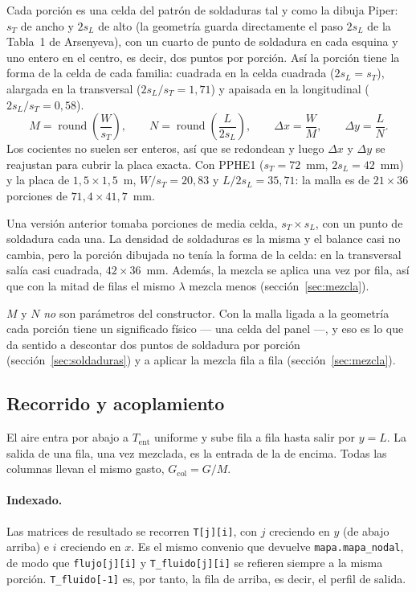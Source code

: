\documentclass[11pt,a4paper]{article}
\begin{document}
Cada porción es una celda del patrón de soldaduras tal y como la dibuja Piper:
$s_T$ de ancho y $2s_L$ de alto (la geometría guarda directamente el paso $2s_L$
de la Tabla~1 de Arsenyeva), con un cuarto de punto de soldadura en cada esquina
y uno entero en el centro, es decir, dos puntos por porción. Así la porción tiene
la forma de la celda de cada familia: cuadrada en la celda cuadrada
($2s_L = s_T$), alargada en la transversal ($2s_L/s_T = 1{,}71$) y apaisada en la
longitudinal ($2s_L/s_T = 0{,}58$).
\[
  M = \operatorname{round}\!\left(\frac{W}{s_T}\right), \qquad
  N = \operatorname{round}\!\left(\frac{L}{2s_L}\right), \qquad
  \Delta x = \frac{W}{M}, \qquad \Delta y = \frac{L}{N}.
\]
Los cocientes no suelen ser enteros, así que se redondean y luego $\Delta x$ y
$\Delta y$ se reajustan para cubrir la placa exacta. Con PPHE1 ($s_T = 72$~mm,
$2s_L = 42$~mm) y la placa de $1{,}5\times1{,}5$~m, $W/s_T = 20{,}83$ y
$L/2s_L = 35{,}71$: la malla es de $21\times36$ porciones de
$71{,}4\times41{,}7$~mm.

Una versión anterior tomaba porciones de media celda, $s_T \times s_L$, con un
punto de soldadura cada una. La densidad de soldaduras es la misma y el balance
casi no cambia, pero la porción dibujada no tenía la forma de la celda: en la
transversal salía casi cuadrada, $42\times36$~mm. Además, la mezcla se aplica una
vez por fila, así que con la mitad de filas el mismo $\lambda$ mezcla menos
(sección~\ref{sec:mezcla}).

$M$ y $N$ \emph{no} son parámetros del constructor. Con la malla ligada a la
geometría cada porción tiene un significado físico --- una celda del panel ---,
y eso es lo que da sentido a descontar dos puntos de soldadura por porción
(sección~\ref{sec:soldaduras}) y a aplicar la mezcla fila a fila
(sección~\ref{sec:mezcla}).

\subsection{Recorrido y acoplamiento}

El aire entra por abajo a $T_{\mathrm{ent}}$ uniforme y sube fila a fila hasta
salir por $y = L$. La salida de una fila, una vez mezclada, es la entrada de la
de encima. Todas las columnas llevan el mismo gasto, $G_{\mathrm{col}} = G/M$.

\paragraph{Indexado.} Las matrices de resultado se recorren
\texttt{T[j][i]}, con $j$ creciendo en $y$ (de abajo arriba) e $i$ creciendo en
$x$. Es el mismo convenio que devuelve \texttt{mapa.mapa\_nodal}, de modo que
\texttt{flujo[j][i]} y \texttt{T\_fluido[j][i]} se refieren siempre a la misma
porción. \texttt{T\_fluido[-1]} es, por tanto, la fila de arriba, es decir, el
perfil de salida.
\end{document}
